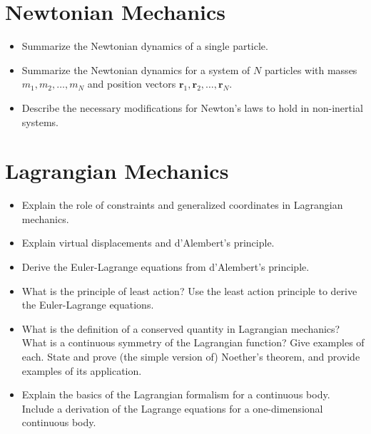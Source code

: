 



\tableofcontents

\section{Newtonian Mechanics}

\begin{itemize}

    \item Summarize the Newtonian dynamics of a single particle.

    \item Summarize the Newtonian dynamics for a system of $ N $ particles with masses $ m_1, m_2, \dots, m_N$ and position vectors $ \bm{r}_1, \bm{r}_2, \dots, \bm{r}_{N} $.

    \item Describe the necessary modifications for Newton's laws to hold in non-inertial systems.

\end{itemize}

\section{Lagrangian Mechanics}

\begin{itemize}

    \item Explain the role of constraints and generalized coordinates in Lagrangian mechanics.

    \item Explain virtual displacements and d'Alembert's principle.

    \item Derive the Euler-Lagrange equations from d'Alembert's principle.

    \item What is the principle of least action? Use the least action principle to derive the Euler-Lagrange equations.

    \item What is the definition of a conserved quantity in Lagrangian mechanics? What is a continuous symmetry of the Lagrangian function? Give examples of each. State and prove (the simple version of) Noether's theorem, and provide examples of its application.

    \item Explain the basics of the Lagrangian formalism for a continuous body. Include a derivation of the Lagrange equations for a one-dimensional continuous body.

\end{itemize}

